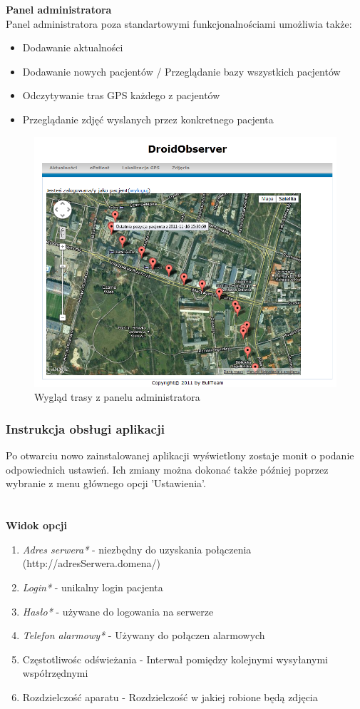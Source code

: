 \documentclass[11pt,a4paper]{article}
\begin{document}
{\bf Panel administratora}\\
Panel administratora poza standartowymi funkcjonalnościami umożliwia także:
\begin{itemize}
\item Dodawanie aktualności
\item Dodawanie nowych pacjentów / Przeglądanie bazy wszystkich pacjentów
\item Odczytywanie tras GPS każdego z pacjentów
\item Przeglądanie zdjęć wyslanych przez konkretnego pacjenta
\end{itemize}
\vspace {20pt}
\begin{figure}[h]
\centering
\includegraphics[scale=0.7]{route.png}   
\caption {Wygląd trasy z panelu administratora}
\end{figure}
\vspace {20pt}

\subsubsection{Instrukcja obsługi aplikacji}

Po otwarciu nowo zainstalowanej aplikacji wyświetlony zostaje monit o podanie odpowiednich ustawień.
Ich zmiany można dokonać także później poprzez wybranie z menu głównego opcji 'Ustawienia'.\\
\\\\
{\bf Widok opcji}
\begin{enumerate}
\item {\it Adres serwera*} - niezbędny do uzyskania połączenia (http://adresSerwera.domena/)
\item {\it Login*} - unikalny login pacjenta
\item {\it Hasło*} - używane do logowania na serwerze
\item {\it Telefon alarmowy*} - Używany do połączen alarmowych
\item Częstotliwośc odświeżania - Interwał pomiędzy kolejnymi wysyłanymi współrzędnymi
\item Rozdzielczość aparatu - Rozdzielczość w jakiej robione będą zdjęcia
\end{enumerate}
\end{document}
